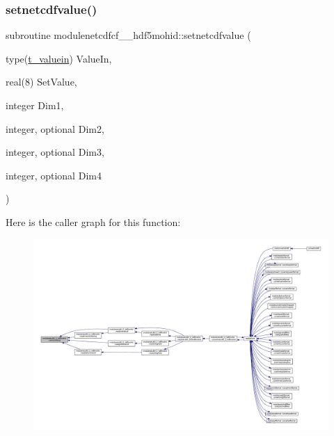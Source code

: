 \mbox{\label{namespacemodulenetcdfcf__2__hdf5mohid_a0a54d00603078be80ce02d8fb4b8a827}} 
\subsubsection{\texorpdfstring{setnetcdfvalue()}{setnetcdfvalue()}}
{\footnotesize\ttfamily subroutine modulenetcdfcf\+\_\+\_\+hdf5mohid\+::setnetcdfvalue (\begin{DoxyParamCaption}\item[{type(\mbox{\hyperlink{structmodulenetcdfcf__2__hdf5mohid_1_1t__valuein}{t\+\_\+valuein}})}]{Value\+In,  }\item[{real(8)}]{Set\+Value,  }\item[{integer}]{Dim1,  }\item[{integer, optional}]{Dim2,  }\item[{integer, optional}]{Dim3,  }\item[{integer, optional}]{Dim4 }\end{DoxyParamCaption})\hspace{0.3cm}{\ttfamily [private]}}

Here is the caller graph for this function\+:\nopagebreak
\begin{figure}[H]
\begin{center}
\leavevmode
\includegraphics[width=350pt]{namespacemodulenetcdfcf__2__hdf5mohid_a0a54d00603078be80ce02d8fb4b8a827_icgraph}
\end{center}
\end{figure}
\mbox{\label{namespacemodulenetcdfcf__2__hdf5mohid_a31008b878c995f8aa06a2f70557abc17}} 

